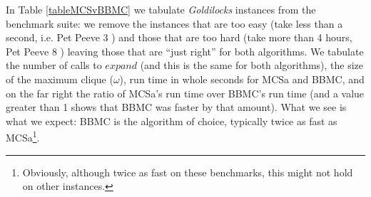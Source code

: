\documentclass[runningheads]{llncs}
\begin{document}
In Table \ref{tableMCSvBBMC} we tabulate \emph{Goldilocks} instances from the benchmark suite: we remove the instances that are too
easy (take less than a second, i.e. Pet Peeve 3 \cite{howTo}) and those that are too hard (take more than 4 hours, Pet Peeve 8 \cite{howTo}) 
leaving those that are ``just right'' for both algorithms. We tabulate the number of calls to $expand$ (and this is the same for 
both algorithms), the size of the maximum clique 
($\omega$), run time in whole seconds for MCSa and BBMC, and on the far right the ratio of MCSa's run time over BBMC's run time
(and a value greater than 1 shows that BBMC was faster by that amount). What we see is what we expect: BBMC is the algorithm of 
choice, typically twice as fast as MCSa\footnote{Obviously, although twice as fast on these benchmarks, this might not hold on
other instances.}.
\end{document}
